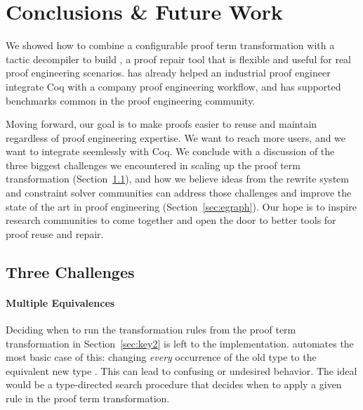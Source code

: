 \section{Conclusions \& Future Work}
\label{sec:discussion}

We showed how to combine a configurable proof term transformation with a tactic decompiler to build \toolname,
a proof repair tool that is flexible and useful for real proof engineering scenarios.
\toolname has already helped an industrial proof engineer integrate Coq with a company proof engineering workflow,
and has supported benchmarks common in the proof engineering community.

Moving forward, our goal is to make proofs easier to reuse and maintain regardless of proof engineering expertise.
We want to reach more users, and we want \toolname to integrate seemlessly with Coq.
We conclude with a discussion of the three biggest challenges we encountered in scaling up the \toolname proof term 
transformation (Section~\ref{sec:problems}), and how we believe ideas from the rewrite system and constraint
solver communities can address those challenges and improve the state of the art in proof engineering (Section~\ref{sec:egraph}).
Our hope is to inspire research communities to come together and open the door to better tools for proof reuse and repair.

\subsection{Three Challenges}
\label{sec:problems}

\paragraph{Multiple Equivalences}

Deciding when to run the transformation rules from the proof term transformation in Section~\ref{sec:key2} is left to the implementation.
\toolname automates the most basic case of this: changing \textit{every} occurrence of the old type \A to the equivalent new type \B.
This can lead to confusing or undesired behavior.
The ideal would be a type-directed search procedure that decides when to apply a given rule in the proof term transformation.

